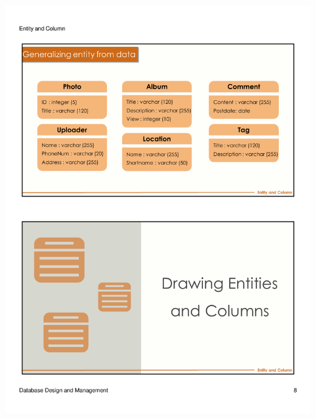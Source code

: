 \begin{frame}{ }
    \centering
    \includegraphics[width=\textwidth, trim={10mm 134mm 10mm 22mm}, clip]{resources/02/02_8}
\end{frame}

